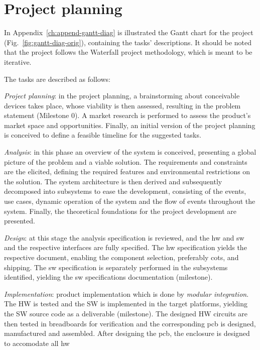 \section{Project planning}%
\label{sec:project-planning}
%
In Appendix~\ref{ch:append-gantt-diag} is illustrated the Gantt chart for the
project (Fig.~\ref{fig:gantt-diag-orig}), containing the tasks' descriptions. It
should be noted that the project follows the Waterfall project
methodology, which is meant to be iterative.

The tasks are described as follows:
\begin{item-c}
\item \emph{Project planning}: in the project planning, a brainstorming about conceivable devices takes place, whose
viability is then assessed, resulting in the problem statement
(Milestone 0). A market research is performed to assess the product's market
space and opportunities. Finally, an initial version of the project planning is
conceived to define a feasible timeline for the suggested tasks.
%
\item \emph{Analysis}: in this phase an overview of the system is conceived,
  presenting a global picture of the problem and a viable solution. The
  requirements and constraints are the elicited, defining the required features
  and environmental restrictions on the solution. The system architecture is
  then derived and subsequently decomposed into subsystems to ease the
  development, consisting of the events, use cases, dynamic operation of the
  system and the flow of events throughout the system. Finally, the theoretical
  foundations for the project development are presented.
%
\item \emph{Design}: at this stage the analysis specification is reviewed, and
  the \gls{hw} and \gls{sw} and the respective interfaces are fully
  specified. The \gls{hw} specification yields the respective document, enabling
  the component selection, preferably \gls{cots}, and shipping. The \gls{sw} specification is separately performed in the
  subsystems identified, yielding the \gls{sw} specifications documentation (milestone).
%
\item \emph{Implementation}: product implementation which is done by
  \emph{modular integration}. The HW is tested and the SW is implemented in the
  target platforms, yielding the SW source code as a deliverable (milestone).
  The designed HW circuits are then tested in breadboards for verification and
  the corresponding \gls{pcb} is designed, manufactured and assembled. After
  designing the \gls{pcb}, the enclosure is designed to accomodate all \gls{hw}

\end{item-c}
